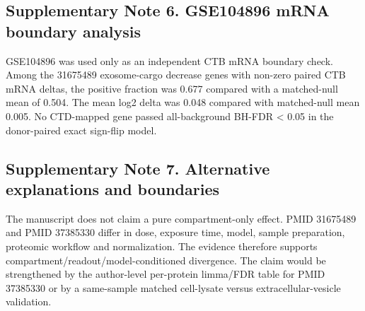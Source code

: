 \documentclass[11pt]{article}
\begin{document}
\subsection*{Supplementary Note 6. GSE104896 mRNA boundary analysis}
GSE104896 was used only as an independent CTB mRNA boundary check. Among the 31675489 exosome-cargo decrease genes with non-zero paired CTB mRNA deltas, the positive fraction was 0.677 compared with a matched-null mean of 0.504. The mean log2 delta was 0.048 compared with matched-null mean 0.005. No CTD-mapped gene passed all-background BH-FDR < 0.05 in the donor-paired exact sign-flip model.

\subsection*{Supplementary Note 7. Alternative explanations and boundaries}
The manuscript does not claim a pure compartment-only effect. PMID 31675489 and PMID 37385330 differ in dose, exposure time, model, sample preparation, proteomic workflow and normalization. The evidence therefore supports compartment/readout/model-conditioned divergence. The claim would be strengthened by the author-level per-protein limma/FDR table for PMID 37385330 or by a same-sample matched cell-lysate versus extracellular-vesicle validation.
\end{document}
